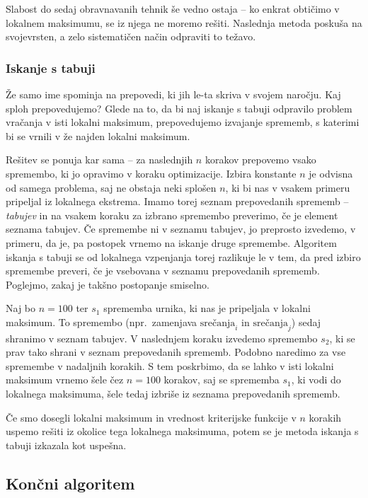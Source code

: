 \documentclass[a4paper,10pt]{article}
\begin{document}
Slabost do sedaj obravnavanih tehnik še vedno ostaja -- ko enkrat obtičimo v lokalnem
maksimumu, se iz njega ne moremo rešiti. Naslednja metoda poskuša na svojevrsten, a zelo
sistematičen način odpraviti to težavo.

\subsubsection{Iskanje s tabuji}

Že samo ime spominja na prepovedi, ki jih le-ta skriva v svojem naročju. Kaj sploh prepovedujemo?
Glede na to, da bi naj iskanje s tabuji odpravilo problem vračanja v isti lokalni maksimum,
prepovedujemo izvajanje sprememb, s katerimi bi se vrnili v že najden lokalni maksimum.

Rešitev se ponuja kar sama -- za naslednjih \(n\) korakov prepovemo vsako spremembo, ki jo
opravimo v koraku optimizacije. Izbira konstante \(n\) je odvisna od samega problema, saj
ne obstaja neki splošen \(n\), ki bi nas v vsakem primeru pripeljal iz lokalnega ekstrema.
Imamo torej seznam prepovedanih sprememb -- \emph{tabujev} in na vsakem koraku za izbrano
spremembo preverimo, če je element seznama tabujev. Če spremembe ni v seznamu tabujev, jo
preprosto izvedemo, v primeru, da je, pa postopek vrnemo na iskanje druge spremembe.
Algoritem iskanja s tabuji se od lokalnega vzpenjanja torej razlikuje le v tem, da pred
izbiro spremembe preveri, če je vsebovana v seznamu prepovedanih sprememb. Poglejmo, zakaj
je takšno postopanje smiselno.

Naj bo \(n = 100\) ter \(s_1\) sprememba urnika, ki nas je pripeljala v lokalni maksimum. To
spremembo (npr.~zamenjava \(\text{srečanja}_i\) in \(\text{srečanja}_j\)) sedaj shranimo v
seznam tabujev. V naslednjem koraku izvedemo spremembo \(s_2\), ki se prav tako shrani v
seznam prepovedanih sprememb. Podobno naredimo za vse spremembe v nadaljnih korakih. S
tem poskrbimo, da se lahko v isti lokalni maksimum vrnemo šele čez \(n = 100\) korakov, saj
se sprememba \(s_1\), ki vodi do lokalnega maksimuma, šele tedaj izbriše iz seznama
prepovedanih sprememb.

Če smo dosegli lokalni maksimum in vrednost kriterijske funkcije v \(n\) korakih uspemo
rešiti iz okolice tega lokalnega maksimuma, potem se je metoda iskanja s tabuji izkazala
kot uspešna.

\subsection{Končni algoritem}
\end{document}
